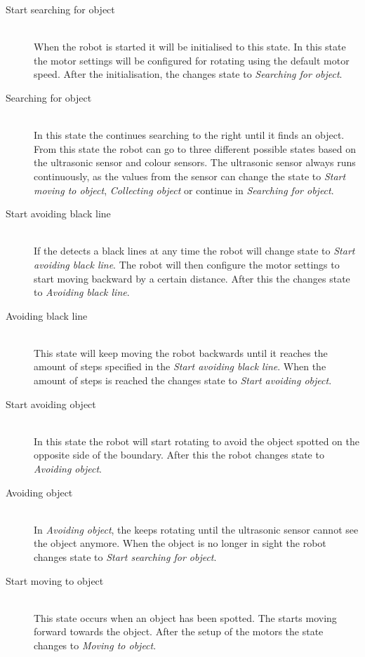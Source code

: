 \begin{description}
\item[Start searching for object] \hfill \\
When the robot is started it will be initialised to this state. In this state the motor settings will be configured for rotating using the default motor speed. After the initialisation, the \projname{} changes state to \emph{Searching for object}.

\item[Searching for object] \hfill \\
In this state the \projname{} continues searching to the right until it finds an object. From this state the robot can go to three different possible states based on the ultrasonic sensor and colour sensors. The ultrasonic sensor always runs continuously, as the values from the sensor can change the state to \emph{Start moving to object}, \emph{Collecting object} or continue in \emph{Searching for object}. 

\item[Start avoiding black line] \hfill \\
If the \projname{} detects a black lines at any time the robot will change state to \emph{Start avoiding black line}. The robot will then configure the motor settings to start moving backward by a certain distance. After this the \projname{} changes state to \emph{Avoiding black line}. 

\item[Avoiding black line] \hfill \\
This state will keep moving the robot backwards until it reaches the amount of steps specified in the \emph{Start avoiding black line}. When the amount of steps is reached the \projname{} changes state to \emph{Start avoiding object}.

\item[Start avoiding object] \hfill \\
In this state the robot will start rotating to avoid the object spotted on the opposite side of the boundary. After this the robot changes state to \emph{Avoiding object}. 

\item[Avoiding object] \hfill \\
In \emph{Avoiding object}, the \projname{} keeps rotating until the ultrasonic sensor cannot see the object anymore. When the object is no longer in sight the robot changes state to \emph{Start searching for object}.

\item[Start moving to object] \hfill \\
This state occurs when an object has been spotted. The \projname{} starts moving forward towards the object. After the setup of the motors the state changes to \emph{Moving to object}.


\end{description}
